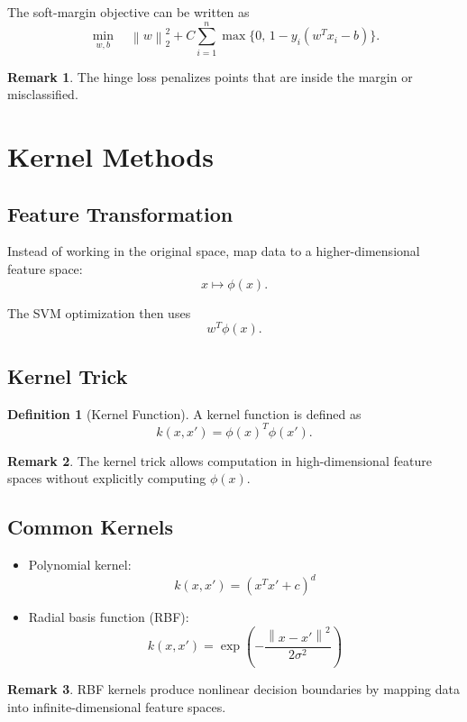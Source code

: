 \documentclass[12pt,oneside]{book}
\numberwithin{equation}{section}
\theoremstyle{definition}
\newtheorem{definition}{Definition}[section]
\newtheorem{remark}{Remark}[section]
\theoremstyle{plain}
\theoremstyle{remark}
\newcommand{\norm}[1]{\left\lVert #1 \right\rVert}
\begin{document}
The soft-margin objective can be written as
\[
\min_{w,b}
\quad
\norm{w}_2^2
+
C \sum_{i=1}^n
\max\{0,\,1 - y_i(w^T x_i - b)\}.
\]

\begin{remark}
The hinge loss penalizes points that are inside the margin or misclassified.
\end{remark}

\section{Kernel Methods}

\subsection{Feature Transformation}

Instead of working in the original space, map data to a higher-dimensional feature space:
\[
x \mapsto \phi(x).
\]

The SVM optimization then uses
\[
w^T \phi(x).
\]

\subsection{Kernel Trick}

\begin{definition}[Kernel Function]
A kernel function is defined as
\[
k(x,x') = \phi(x)^T \phi(x').
\]
\end{definition}

\begin{remark}
The kernel trick allows computation in high-dimensional feature spaces without explicitly computing $\phi(x)$.
\end{remark}

\subsection{Common Kernels}

\begin{itemize}
    \item Polynomial kernel:
    \[
    k(x,x') = (x^T x' + c)^d
    \]
    \item Radial basis function (RBF):
    \[
    k(x,x') = \exp\left(-\frac{\norm{x-x'}^2}{2\sigma^2}\right)
    \]
\end{itemize}

\begin{remark}
RBF kernels produce nonlinear decision boundaries by mapping data into infinite-dimensional feature spaces.
\end{remark}
\end{document}
